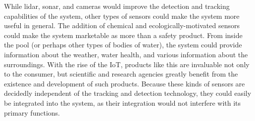 While lidar, sonar, and cameras would improve the detection and tracking capabilities of the system, other types of sensors could make the system more useful in general. The addition of chemical and ecologically-motivated sensors could make the system marketable as more than a safety product. From inside the pool (or perhaps other types of bodies of water), the system could provide information about the weather, water health, and various information about the surroundings. With the rise of the IoT, products like this are invaluable not only to the consumer, but scientific and research agencies greatly benefit from the existence and development of such products. Because these kinds of sensors are decidedly independent of the tracking and detection technology, they could easily be integrated into the system, as their integration would not interfere with its primary functions.